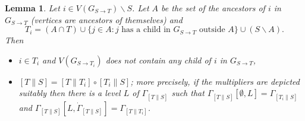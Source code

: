 \documentclass[12pt]{amsart}
\theoremstyle{plain}
\newtheorem{lem}[thm]{Lemma}
\theoremstyle{definition}
\theoremstyle{remark}
\numberwithin{equation}{section}
\theoremstyle{plain}
\newcommand{\0}{\emptyset}
\newcommand{\mi}{\smallsetminus}
\newcommand{\stri}{\Gamma}
\begin{document}
\begin{lem}\label{graph:split}
Let $i \in V(G_{S \rightarrow T}) \mi S$. Let $A$ be the set of the ancestors of $i$ in $G_{S \rightarrow T}$ (vertices are ancestors of themselves) and
\[
T_i = (A \cap T) \cup \{ j \in A : j \text{ has a child in } G_{S \rightarrow T} \text{ outside } A \} \cup (S \mi A).
\]
Then
\begin{itemize}
  \item $i \in T_i$ and $V(G_{S \rightarrow T_i})$ does not contain any child of $i$ in $G_{S \rightarrow T}$,
  \item $[T \| S] = [T \| T_i] \circ [T_i \| S]$; more precisely, if the multipliers are depicted suitably then there is a level $L$ of $\stri_{[T \| S]}$ such that $\stri_{[T \| S]}[\0, L] = \stri_{[{T_i} \| S]}$ and $\stri_{[T \| S]}[L, \dot \stri_{[T \| S]}] = \stri_{[{T} \| {T_i}]}$.
\end{itemize}
\end{lem}
\end{document}
